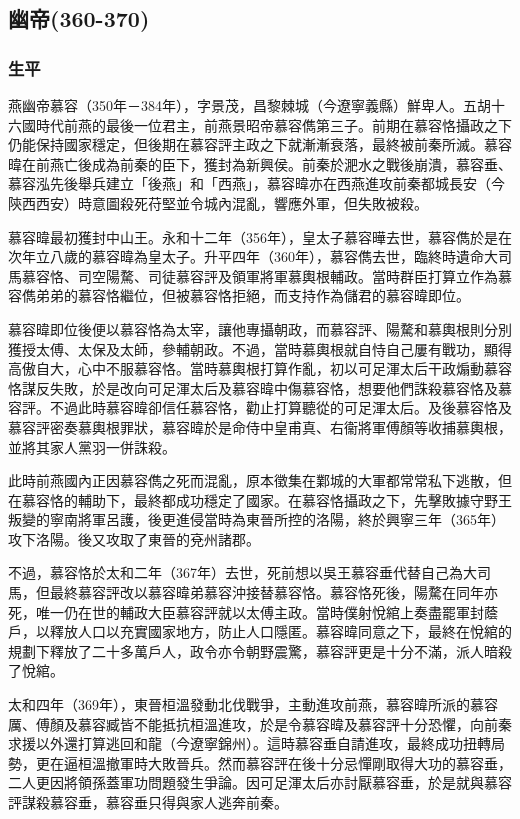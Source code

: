 
\subsection{幽帝\tiny(360-370)}

\subsubsection{生平}

燕幽帝慕容（350年－384年），字景茂，昌黎棘城（今遼寧義縣）鮮卑人。五胡十六國時代前燕的最後一位君主，前燕景昭帝慕容儁第三子。前期在慕容恪攝政之下仍能保持國家穩定，但後期在慕容評主政之下就漸漸衰落，最終被前秦所滅。慕容暐在前燕亡後成為前秦的臣下，獲封為新興侯。前秦於淝水之戰後崩潰，慕容垂、慕容泓先後舉兵建立「後燕」和「西燕」，慕容暐亦在西燕進攻前秦都城長安（今陝西西安）時意圖殺死苻堅並令城內混亂，響應外軍，但失敗被殺。

慕容暐最初獲封中山王。永和十二年（356年），皇太子慕容曄去世，慕容儁於是在次年立八歲的慕容暐為皇太子。升平四年（360年），慕容儁去世，臨終時遺命大司馬慕容恪、司空陽騖、司徒慕容評及領軍將軍慕輿根輔政。當時群臣打算立作為慕容儁弟弟的慕容恪繼位，但被慕容恪拒絕，而支持作為儲君的慕容暐即位。

慕容暐即位後便以慕容恪為太宰，讓他專攝朝政，而慕容評、陽騖和慕輿根則分別獲授太傅、太保及太師，參輔朝政。不過，當時慕輿根就自恃自己屢有戰功，顯得高傲自大，心中不服慕容恪。當時慕輿根打算作亂，初以可足渾太后干政煽動慕容恪謀反失敗，於是改向可足渾太后及慕容暐中傷慕容恪，想要他們誅殺慕容恪及慕容評。不過此時慕容暐卻信任慕容恪，勸止打算聽從的可足渾太后。及後慕容恪及慕容評密奏慕輿根罪狀，慕容暐於是命侍中皇甫真、右衞將軍傅顏等收捕慕輿根，並將其家人黨羽一併誅殺。

此時前燕國內正因慕容儁之死而混亂，原本徵集在鄴城的大軍都常常私下逃散，但在慕容恪的輔助下，最終都成功穩定了國家。在慕容恪攝政之下，先擊敗據守野王叛變的寧南將軍呂護，後更進侵當時為東晉所控的洛陽，終於興寧三年（365年）攻下洛陽。後又攻取了東晉的兗州諸郡。

不過，慕容恪於太和二年（367年）去世，死前想以吳王慕容垂代替自己為大司馬，但最終慕容評改以慕容暐弟慕容沖接替慕容恪。慕容恪死後，陽騖在同年亦死，唯一仍在世的輔政大臣慕容評就以太傅主政。當時僕射悅綰上奏盡罷軍封蔭戶，以釋放人口以充實國家地方，防止人口隱匿。慕容暐同意之下，最終在悅綰的規劃下釋放了二十多萬戶人，政令亦令朝野震驚，慕容評更是十分不滿，派人暗殺了悅綰。

太和四年（369年），東晉桓溫發動北伐戰爭，主動進攻前燕，慕容暐所派的慕容厲、傅顏及慕容臧皆不能抵抗桓溫進攻，於是令慕容暐及慕容評十分恐懼，向前秦求援以外還打算逃回和龍（今遼寧錦州）。這時慕容垂自請進攻，最終成功扭轉局勢，更在逼桓溫撤軍時大敗晉兵。然而慕容評在後十分忌憚剛取得大功的慕容垂，二人更因將領孫蓋軍功問題發生爭論。因可足渾太后亦討厭慕容垂，於是就與慕容評謀殺慕容垂，慕容垂只得與家人逃奔前秦。

